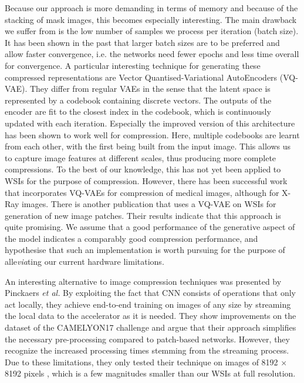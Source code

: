 Because our approach is more demanding in terms of memory and because of the stacking of mask images, this becomes especially interesting. The main drawback we suffer from is the low number of samples we process per iteration (batch size). It has been shown in the past that larger batch sizes are to be preferred and allow faster convergence, i.e. the networks need fewer epochs and less time overall for convergence. \cite{Smith2017Dont}
A particular interesting technique for generating these compressed representations are Vector Quantised-Variational AutoEncoders (VQ-VAE). They differ from regular VAEs in the sense that the latent space is represented by a codebook containing discrete vectors. The outputs of the encoder are fit to the closest index in the codebook, which is continuously updated with each iteration. \cite{Oord2017Neural} Especially the improved version of this architecture has been shown to work well for compression. Here, multiple codebooks are learnt from each other, with the first being built from the input image. This allows us to capture image features at different scales, thus producing more complete compressions. \cite{Razavi2019Generating} To the best of our knowledge, this has not yet been applied to WSIs for the purpose of compression. However, there has been successful work that incorporates VQ-VAEs for compression of medical images, although for X-Ray images. \cite{Rajpurkar2017CheXNet} There is another publication that uses a VQ-VAE on WSIs for generation of new image patches. \cite{Chen2022Fasta} Their results indicate that this approach is quite promising. We assume that a good performance of the generative aspect of the model indicates a comparably good compression performance, and hypothesise that such an implementation is worth pursuing for the purpose of alle\textit{via}ting our current hardware limitations. 

An interesting alternative to image compression techniques was presented by Pinckaers \textit{et al.} By exploiting the fact that CNN consists of operations that only act locally, they achieve end-to-end training on images of any size by streaming the local data to the accelerator as it is needed. They show improvements on the dataset of the CAMELYON17 challenge and argue that their approach simplifies the necessary pre-processing compared to patch-based networks. However, they recognize the increased processing times stemming from the streaming process. Due to these limitations, they only tested their technique on images of 8192 × 8192 pixels \cite{Pinckaers2019Streaming}, which is a few magnitudes smaller than our WSIs at full resolution.

